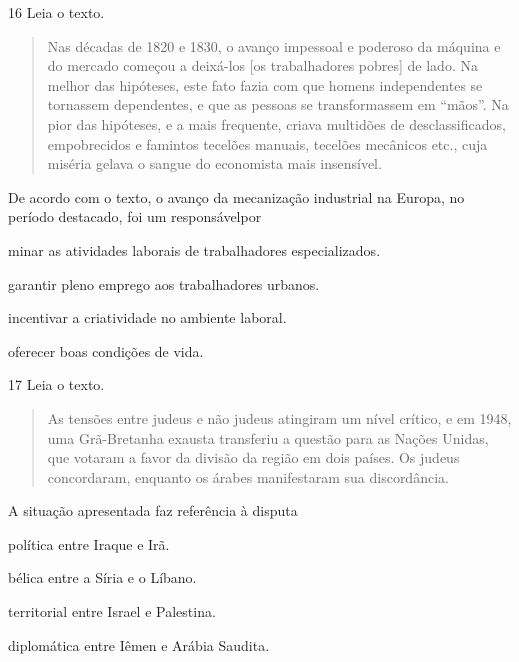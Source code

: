 \num{16} Leia o texto.

\begin{quote}
Nas décadas de 1820 e 1830, o avanço impessoal e poderoso da
máquina e do mercado começou a deixá-los [os trabalhadores pobres] de lado. Na melhor das
hipóteses, este fato fazia com que homens independentes se tornassem
dependentes, e que as pessoas se transformassem em ``mãos''. Na pior das
hipóteses, e a mais frequente, criava multidões de desclassificados,
empobrecidos e famintos tecelões manuais, tecelões mecânicos etc., cuja
miséria gelava o sangue do economista mais insensível.

\end{quote}

De acordo com o texto, o avanço da mecanização industrial na Europa, no
período destacado, foi um responsávelpor

\begin{escolha}
\item  minar as atividades laborais de trabalhadores especializados.

\item  garantir pleno emprego aos trabalhadores urbanos.

\item  incentivar a criatividade no ambiente laboral.

\item  oferecer boas condições de vida.
\end{escolha}

\num{17} Leia o texto.

\begin{quote}
As tensões entre judeus e não judeus atingiram um nível crítico, e em 1948, uma Grã-Bretanha exausta transferiu a questão para as Nações Unidas, que votaram a favor da divisão da região em dois países. Os judeus concordaram, enquanto os árabes manifestaram sua discordância.

\end{quote}

A situação apresentada faz referência à disputa

\begin{escolha}
\item  política entre Iraque e Irã.

\item  bélica entre a Síria e o Líbano.

\item  territorial entre Israel e Palestina.

\item  diplomática entre Iêmen e Arábia Saudita.
\end{escolha}

